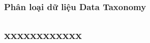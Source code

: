 \documentclass{beamer}
\begin{document}
\subsubsection{Phân loại dữ liệu Data Taxonomy}

\subsection{xxxxxxxxxxxx}

\end{document}
